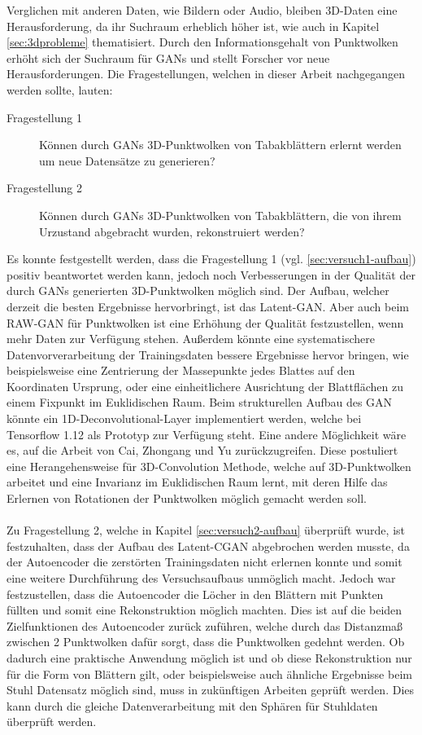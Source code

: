 \documentclass{llncs}
\begin{document}
Verglichen mit anderen Daten, wie Bildern oder Audio, bleiben 3D-Daten eine Herausforderung, da ihr Suchraum erheblich höher ist, wie auch in Kapitel \ref{sec:3dprobleme} thematisiert. Durch den Informationsgehalt von Punktwolken erhöht sich der Suchraum für GANs und stellt Forscher vor neue Herausforderungen. Die Fragestellungen, welchen in dieser Arbeit nachgegangen werden sollte, lauten:
\begin{description}
\item[Fragestellung 1] Können durch GANs 3D-Punktwolken von Tabakblättern erlernt werden um neue Datensätze zu generieren?\\
\item[Fragestellung 2] Können durch GANs 3D-Punktwolken von Tabakblättern, die von ihrem Urzustand abgebracht wurden, rekonstruiert werden? 
\end{description}
Es konnte festgestellt werden, dass die Fragestellung 1 (vgl. \ref{sec:versuch1-aufbau}) positiv beantwortet werden kann, jedoch noch Verbesserungen in der Qualität der durch GANs generierten 3D-Punktwolken möglich sind. Der Aufbau, welcher derzeit die besten Ergebnisse hervorbringt, ist das Latent-GAN. Aber auch beim RAW-GAN für Punktwolken ist eine Erhöhung der Qualität festzustellen, wenn mehr Daten zur Verfügung stehen. Außerdem könnte eine systematischere Datenvorverarbeitung der Trainingsdaten bessere Ergebnisse hervor bringen, wie beispielsweise eine Zentrierung der Massepunkte jedes Blattes auf den Koordinaten Ursprung, oder eine einheitlichere Ausrichtung der Blattflächen zu einem Fixpunkt im Euklidischen Raum. Beim strukturellen Aufbau des GAN könnte ein 1D-Deconvolutional-Layer implementiert werden, welche bei Tensorflow 1.12 als Prototyp zur Verfügung steht. Eine andere Möglichkeit wäre es, auf die Arbeit von Cai, Zhongang  und Yu \cite{3d-conv} zurückzugreifen. Diese postuliert eine Herangehensweise für 3D-Convolution Methode, welche auf 3D-Punktwolken arbeitet und eine Invarianz im Euklidischen Raum lernt, mit deren Hilfe das Erlernen von Rotationen der Punktwolken möglich gemacht werden soll.
\\\\
Zu Fragestellung 2, welche in Kapitel \ref{sec:versuch2-aufbau} überprüft wurde, ist festzuhalten, dass der Aufbau des Latent-CGAN abgebrochen werden musste, da der Autoencoder die zerstörten Trainingsdaten nicht erlernen konnte und somit eine weitere Durchführung des Versuchsaufbaus unmöglich macht. Jedoch war festzustellen, dass die Autoencoder die Löcher in den Blättern mit Punkten füllten und somit eine Rekonstruktion möglich machten. Dies ist auf die beiden Zielfunktionen des Autoencoder zurück zuführen, welche durch das Distanzmaß zwischen 2 Punktwolken dafür sorgt, dass die Punktwolken gedehnt werden. Ob dadurch eine praktische Anwendung möglich ist und ob diese Rekonstruktion nur für die Form von Blättern gilt, oder beispielsweise auch ähnliche Ergebnisse beim Stuhl Datensatz möglich sind, muss in zukünftigen Arbeiten geprüft werden. Dies kann durch die gleiche Datenverarbeitung mit den Sphären für Stuhldaten überprüft werden. 
\end{document}
